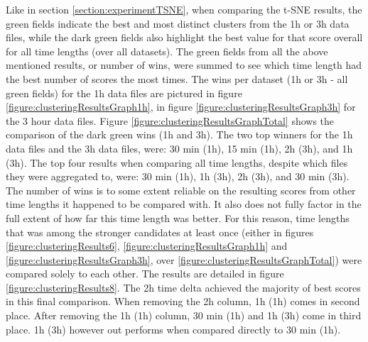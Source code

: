 Like in section \ref{section:experimentTSNE}, when comparing the t-SNE results, the green fields indicate the best and most distinct clusters from the 1h or 3h data files, while the dark green fields also highlight the best value for that score overall for all time lengths (over all datasets). The green fields from all the above mentioned results, or number of wins, were summed to see which time length had the best number of scores the most times. The wins per dataset (1h or 3h - all green fields) for the 1h data files are pictured in figure \ref{figure:clusteringResultsGraph1h}, in figure \ref{figure:clusteringResultsGraph3h} for the 3 hour data files. Figure \ref{figure:clusteringResultsGraphTotal} shows the comparison of the dark green wins (1h and 3h). The two top winners for the 1h data files and the 3h data files, were: 30 min (1h), 15 min (1h), 2h (3h), and 1h (3h). The top four results when comparing all time lengths, despite which files they were aggregated to, were: 30 min (1h), 1h (3h), 2h (3h), and 30 min (3h). The number of wins is to some extent reliable on the resulting scores from other time lengths it happened to be compared with. It also does not fully factor in the full extent of how far this time length was better. For this reason, time lengths that was among the stronger candidates at least once (either in figures \ref{figure:clusteringResults6}, \ref{figure:clusteringResultsGraph1h} and \ref{figure:clusteringResultsGraph3h}, over \ref{figure:clusteringResultsGraphTotal}) were compared solely to each other. The results are detailed in figure \ref{figure:clusteringResults8}. The 2h time delta achieved the majority of best scores in this final comparison. When removing the 2h column, 1h (1h) comes in second place.
After removing the 1h (1h) column, 30 min (1h) and 1h (3h) come in third place. 1h (3h) however out performs when compared directly to 30 min (1h).

